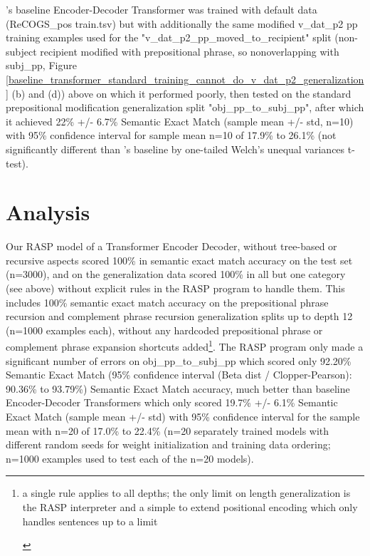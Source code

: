 \documentclass[11pt]{article}
\begin{document}
\cite{Wu2023}'s baseline Encoder-Decoder Transformer was trained with default data (ReCOGS\_pos train.tsv) but with additionally the same modified v\_dat\_p2 pp training examples used for the "v\_dat\_p2\_pp\_moved\_to\_recipient" split (non-subject recipient modified with prepositional phrase, so nonoverlapping with subj\_pp, Figure \ref{baseline_transformer_standard_training_cannot_do_v_dat_p2_generalization} (b) and (d)) above on which it performed poorly, then tested on the standard prepositional modification generalization split "obj\_pp\_to\_subj\_pp", after which it achieved 22\% +/- 6.7\% Semantic Exact Match (sample mean +/- std, n=10) with 95\% confidence interval for sample mean n=10 of 17.9\% to 26.1\% (not significantly different than \cite{Wu2023}'s baseline by one-tailed Welch's unequal variances t-test). 

\section{Analysis} 
Our RASP model of a Transformer Encoder Decoder, without tree-based or recursive aspects scored 100\% in semantic exact match accuracy on the \cite{Wu2023} test set (n=3000), and on the generalization data scored 100\% in all but one category (see above) without explicit rules in the RASP program to handle them. This includes 100\% semantic exact match accuracy on the prepositional phrase recursion and complement phrase recursion generalization splits up to depth 12 (n=1000 examples each), without any hardcoded prepositional phrase or complement phrase expansion shortcuts added\footnote{\begin{footnotesize}a single rule applies to all depths; the only limit on length generalization is the RASP interpreter and a simple to extend positional encoding which only handles sentences up to a limit
\end{footnotesize}}. The RASP program only made a significant number of errors on obj\_pp\_to\_subj\_pp which scored only 92.20\% Semantic Exact Match (95\% confidence interval (Beta dist / Clopper-Pearson): 90.36\% to 93.79\%) Semantic Exact Match accuracy, much better than \cite{Wu2023} baseline Encoder-Decoder Transformers which only scored 19.7\% +/- 6.1\% Semantic Exact Match (sample mean +/- std) with 95\% confidence interval for the sample mean with n=20 of 17.0\% to 22.4\% (n=20 separately trained models with different random seeds for weight initialization and training data ordering; n=1000 examples used to test each of the n=20 models).
\end{document}
